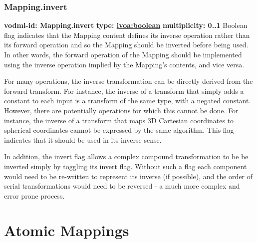     \subsubsection{Mapping.invert}
      \textbf{vodml-id: Mapping.invert} \newline
      \textbf{type: \hyperref[sect:ivoa]{ivoa:boolean}} \newline
      \textbf{multiplicity: 0..1} \newline 
      Boolean flag indicates that the Mapping content defines its inverse operation rather than its forward operation and so the Mapping should be inverted before being used. In other words, the forward operation of the Mapping should be implemented using the inverse operation implied by the Mapping's contents, and vice versa. 

      For many operations, the inverse transformation can be directly derived from the forward transform. For instance, the inverse of a transform that simply adds a constant to each input is a transform of the same type, with a negated constant. However, there are potentially operations for which this cannot be done. For instance, the inverse of a transform that maps 3D Cartesian coordinates to spherical coordinates cannot be expressed by the same algorithm. This flag indicates that it should be used in its inverse sense. 

      In addition, the invert flag allows a complex compound transformation to be be inverted simply by toggling its invert flag. Without such a flag each component would need to be re-written to represent its inverse (if possible), and the order of serial transformations would need to be reversed - a much more complex and error prone process.


\pagebreak
\section{Atomic Mappings}

